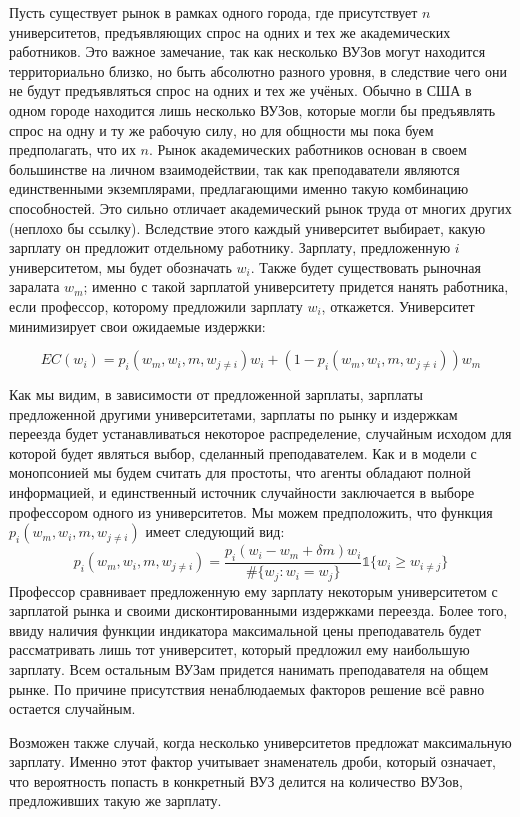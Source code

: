 \documentclass[a4paper, 12pt]{article}
\theoremstyle{definition}
\theoremstyle{plain}
\begin{document}
Пусть существует рынок в рамках одного города, где присутствует $n$ университетов, предъявляющих спрос на одних и тех же академических работников. Это важное замечание, так как несколько ВУЗов могут находится территориально близко, но быть абсолютно разного уровня, в следствие чего они не будут предъявляться спрос на одних и тех же учёных. Обычно в США в одном городе находится лишь несколько ВУЗов, которые могли бы предъявлять спрос на одну и ту же рабочую силу, но для общности мы пока буем предполагать, что их $n$. Рынок академических работников основан в своем большинстве на личном взаимодействии, так как преподаватели являются единственными экземплярами, предлагающими именно такую комбинацию способностей. Это сильно отличает академический рынок труда от многих других (неплохо бы ссылку). Вследствие этого каждый университет выбирает, какую зарплату он предложит отдельному работнику. Зарплату, предложенную $i$ университетом, мы будет обозначать $w_i$. Также будет существовать рыночная заралата $w_m$; именно с такой зарплатой университету придется нанять работника, если профессор, которому предложили зарплату $w_i$, откажется. Университет минимизирует свои ожидаемые издержки: 

\[
EC(w_i) = p_i(w_m, w_i, m, w_{j \neq i})w_i + (1 - p_i(w_m, w_i, m, w_{j \neq i}))w_m
\]

Как мы видим, в зависимости от предложенной зарплаты, зарплаты предложенной другими университетами, зарплаты по рынку и издержкам переезда будет устанавливаться некоторое распределение, случайным исходом для которой будет являться выбор, сделанный преподавателем. Как и в модели с монопсонией мы будем считать для простоты, что агенты обладают полной информацией, и единственный источник случайности заключается в выборе профессором одного из университетов. Мы можем предположить, что функция $p_i ( w_m, w_i, m, w_{j \neq i}) $ имеет следующий вид: 
\[
p_i( w_m, w_i, m, w_{j \neq i}) = \frac{p_i(w_i - w_m + \delta m) w_i}{\#\{w_j : w_i = w_j\}}\mathds{1} \{ w_i \geq w_ {i \neq j}\}
\]
Профессор сравнивает предложенную ему зарплату некоторым университетом с зарплатой рынка и своими дисконтированными издержками переезда. Более того, ввиду наличия функции индикатора максимальной цены преподаватель будет рассматривать лишь тот университет, который предложил ему наибольшую зарплату. Всем остальным ВУЗам придется нанимать преподавателя на общем рынке. По причине присутствия ненаблюдаемых факторов решение всё равно остается случайным. 


Возможен также случай, когда несколько университетов предложат максимальную зарплату. Именно этот фактор учитывает знаменатель дроби, который означает, что вероятность попасть в конкретный ВУЗ делится на количество ВУЗов, предложивших такую же зарплату. 
\end{document}
